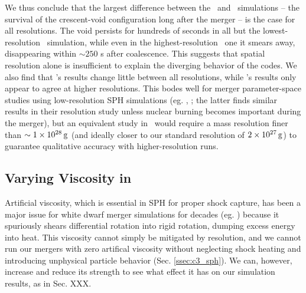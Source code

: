 
We thus conclude that the largest difference between the \gasoline\ and \arepo\ simulations -- the survival of the crescent-void configuration long after the merger -- is the case for all resolutions.  The void persists for hundreds of seconds in all but the lowest-resolution \arepo\ simulation, while even in the highest-resolution \gasoline\ one it smears away, disappearing within $\sim 250$ s after coalescence.  This suggests that spatial resolution alone is insufficient to explain the diverging behavior of the codes.  We also find that \gasoline's results change little between all resolutions, while \arepo's results only appear to agree at higher resolutions.  This bodes well for merger parameter-space studies using low-resolution SPH simulations (eg. \citeal{zhu+13}, \citealt{dan+14}; the latter finds similar results in their resolution study unless nuclear burning becomes important during the merger), but an equivalent study in \arepo\ would require a mass resolution finer than $\sim1\times10^{28}\,\mathrm{g}$ (and ideally closer to our standard resolution of $2\times10^{27}\,\mathrm{g}$) to guarantee qualitative accuracy with higher-resolution runs.

\subsection{Varying Viscosity in \gasoline}
\label{ssec:c3_vary_visc}

Artificial viscosity, which is essential in SPH for proper shock capture, has been a major issue for white dwarf merger simulations for decades (eg. \citealt{guerig04, loreig09}) because it spuriously shears differential rotation into rigid rotation, dumping excess energy into heat.  This viscosity cannot simply be mitigated by resolution, and we cannot run our mergers with zero artifical viscosity without neglecting shock heating and introducing unphysical particle behavior (Sec. \ref{ssec:c3_sph}).  We can, however, increase and reduce its strength to see what effect it has on our simulation results, as in \citeal{zhu+13} {\charles Sec. XXX}.

